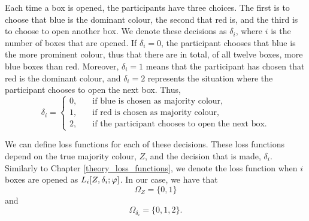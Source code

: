 
Each time a box is opened, the participants have three choices. The first is to choose that blue is the dominant colour, the second that red is, and the third is to choose to open another box. We denote these decisions as $\delta_i$, where $i$ is the number of boxes that are opened. If $\delta_i = 0$, the participant chooses that blue is the more prominent colour, thus that there are in total, of all twelve boxes, more blue boxes than red. Moreover, $\delta_i=1$ means that the participant has chosen that red is the dominant colour, and $\delta_i=2$ represents the situation where the participant chooses to open the next box. Thus,
\begin{equation}
\label{def_of_delta}
    \delta_i =
    \begin{cases}
        0,& \quad \text{if blue is chosen as majority colour,}\\
        1,& \quad \text{if red is chosen as majority colour,}\\
        2,& \quad \text{if the participant chooses to open the next box.}
    \end{cases}
\end{equation}

We can define loss functions for each of these decisions. These loss functions depend on the true majority colour, $Z$, and the decision that is made, $\delta_i$. Similarly to Chapter \ref{theory_loss_functions}, we denote the loss function when $i$ boxes are opened as $L_i[Z,\delta_i;\varphi]$. In our case, we have that 
\begin{equation*}
    \Omega_Z = \{0,1\}
\end{equation*}
and 
\begin{equation*}
    \Omega_{\delta_i}=\{0,1,2\}.
\end{equation*}


